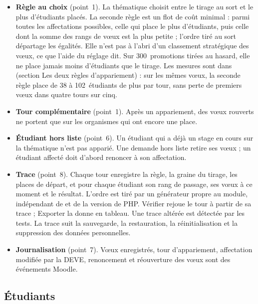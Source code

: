\documentclass[11pt,a4paper]{article}
\begin{document}
\begin{itemize}
  \item \textbf{Règle au choix} (point~1). La thématique choisit entre le tirage au sort et
    \og le plus d'étudiants placés\fg{}. La seconde règle est un flot de coût minimal : parmi
    toutes les affectations possibles, celle qui place le plus d'étudiants, puis celle dont la
    somme des rangs de vœux est la plus petite ; l'ordre tiré au sort départage les égalités. Elle
    n'est pas à l'abri d'un classement stratégique des vœux, ce que l'aide du réglage dit. Sur
    300~promotions tirées au hasard, elle ne place jamais moins d'étudiants que le tirage. Les
    mesures sont dans  (section \og Les deux règles d'appariement\fg{}) : sur les mêmes vœux, la seconde règle place de 38 à 102~étudiants de plus par tour, sans perte de premiers vœux dans quatre tours sur cinq.
  \item \textbf{Tour complémentaire} (point~1). Après un appariement, des vœux rouverts ne portent
    que sur les organismes qui ont encore une place.
  \item \textbf{Étudiant hors liste} (point~6). Un étudiant qui a déjà un stage en cours sur la
    thématique n'est pas apparié. Une demande hors liste retire ses vœux ; un étudiant affecté doit
    d'abord renoncer à son affectation.
  \item \textbf{Trace} (point~8). Chaque tour enregistre la règle, la graine du tirage, les places
    de départ, et pour chaque étudiant son rang de passage, ses vœux à ce moment et le résultat.
    L'ordre est tiré par un générateur propre au module, indépendant de  et de la
    version de PHP. \og Vérifier\fg{} rejoue le tour à partir de sa trace ; \og Exporter\fg{} la
    donne en tableau. Une trace altérée est détectée par les tests. La trace suit la sauvegarde,
    la restauration, la réinitialisation et la suppression des données personnelles.
  \item \textbf{Journalisation} (point~7). Vœux enregistrés, tour d'appariement, affectation
    modifiée par la DEVE, renoncement et réouverture des vœux sont des événements Moodle.
\end{itemize}

\subsection{Étudiants}
\end{document}
